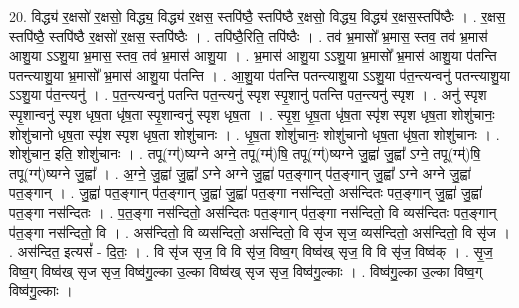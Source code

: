 \documentclass[17pt]{extarticle}
\begin{document}
20. विद्ध्य॑ र॒क्षसो॑ र॒क्षसो॒ विद्ध्य॒ विद्ध्य॑ र॒क्षस॒ स्तपि॑ष्ठै॒ स्तपि॑ष्ठै र॒क्षसो॒ विद्ध्य॒ विद्ध्य॑ र॒क्षस॒स्तपि॑ष्ठैः । . र॒क्षस॒ स्तपि॑ष्ठै॒ स्तपि॑ष्ठै र॒क्षसो॑ र॒क्षस॒ स्तपि॑ष्ठैः । . तपि॑ष्ठै॒रिति॒ तपि॑ष्ठैः । . तव॑ भ्र॒मासो᳚ भ्र॒मास॒ स्तव॒ तव॑ भ्र॒मास॑ आशु॒या ऽऽशु॒या भ्र॒मास॒ स्तव॒ तव॑ भ्र॒मास॑ आशु॒या । . भ्र॒मास॑ आशु॒या ऽऽशु॒या भ्र॒मासो᳚ भ्र॒मास॑ आशु॒या प॑तन्ति पतन्त्याशु॒या भ्र॒मासो᳚ भ्र॒मास॑ आशु॒या प॑तन्ति । . आ॒शु॒या प॑तन्ति पतन्त्याशु॒या ऽऽशु॒या प॑त॒न्त्यन्वनु॑ पतन्त्याशु॒या ऽऽशु॒या प॑त॒न्त्यनु॑ । . प॒त॒न्त्यन्वनु॑ पतन्ति पत॒न्त्यनु॑ स्पृश स्पृ॒शानु॑ पतन्ति पत॒न्त्यनु॑ स्पृश । . अनु॑ स्पृश स्पृ॒शान्वनु॑ स्पृश धृष॒ता धृ॑ष॒ता स्पृ॒शान्वनु॑ स्पृश धृष॒ता । . स्पृ॒श॒ धृ॒ष॒ता धृ॑ष॒ता स्पृ॑श स्पृश धृष॒ता शोशु॑चानः॒ शोशु॑चानो धृष॒ता स्पृ॑श स्पृश धृष॒ता शोशु॑चानः । . धृ॒ष॒ता शोशु॑चानः॒ शोशु॑चानो धृष॒ता धृ॑ष॒ता शोशु॑चानः । . शोशु॑चान॒ इति॒ शोशु॑चानः । . तपू(ग्ग्॑)ष्यग्ने अग्ने॒ तपू(ग्म्॑)षि॒ तपू(ग्ग्॑)ष्यग्ने जु॒ह्वा॑ जु॒ह्वा᳚ ऽग्ने॒ तपू(ग्म्॑)षि॒ तपू(ग्ग्॑)ष्यग्ने जु॒ह्वा᳚ । . अ॒ग्ने॒ जु॒ह्वा॑ जु॒ह्वा᳚ ऽग्ने अग्ने जु॒ह्वा॑ पत॒ङ्गान् प॑त॒ङ्गान् जु॒ह्वा᳚ ऽग्ने अग्ने जु॒ह्वा॑ पत॒ङ्गान् । . जु॒ह्वा॑ पत॒ङ्गान् प॑त॒ङ्गान् जु॒ह्वा॑ जु॒ह्वा॑ पत॒ङ्गा नस॑न्दितो॒ अस॑न्दितः पत॒ङ्गान् जु॒ह्वा॑ जु॒ह्वा॑ पत॒ङ्गा नस॑न्दितः । . प॒त॒ङ्गा नस॑न्दितो॒ अस॑न्दितः पत॒ङ्गान् प॑त॒ङ्गा नस॑न्दितो॒ वि व्यस॑न्दितः पत॒ङ्गान् प॑त॒ङ्गा नस॑न्दितो॒ वि । . अस॑न्दितो॒ वि व्यस॑न्दितो॒ अस॑न्दितो॒ वि सृ॑ज सृज॒ व्यस॑न्दितो॒ अस॑न्दितो॒ वि सृ॑ज । . अस॑न्दित॒ इत्यसं᳚ - दि॒तः॒ । . वि सृ॑ज सृज॒ वि वि सृ॑ज॒ विष्व॒ग् विष्व॑ख् सृज॒ वि वि सृ॑ज॒ विष्व॑क् । . सृ॒ज॒ विष्व॒ग् विष्व॑ख् सृज सृज॒ विष्व॑गु॒ल्का उ॒ल्का विष्व॑ख् सृज सृज॒ विष्व॑गु॒ल्काः । . विष्व॑गु॒ल्का उ॒ल्का विष्व॒ग् विष्व॑गु॒ल्काः । \newline
\end{document}
